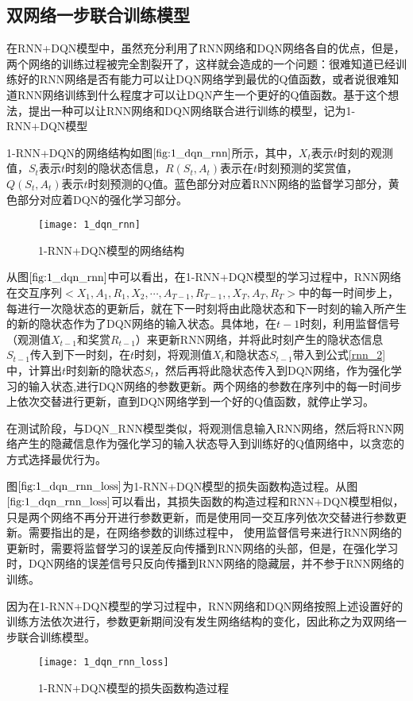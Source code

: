 \subsection{双网络一步联合训练模型}
在RNN+DQN模型中，虽然充分利用了RNN网络和DQN网络各自的优点，但是，两个网络的训练过程被完全割裂开了，这样就会造成的一个问题：很难知道已经训练好的RNN网络是否有能力可以让DQN网络学到最优的Q值函数，或者说很难知道RNN网络训练到什么程度才可以让DQN产生一个更好的Q值函数。基于这个想法，提出一种可以让RNN网络和DQN网络联合进行训练的模型，记为1-RNN+DQN模型

1-RNN+DQN的网络结构如图$\ref{fig:1_dqn_rnn}$所示，其中，$X_{t}$表示$t$时刻的观测值，$S_{t}$表示$t$时刻的隐状态信息，$R(S_{t},A_{t})$表示在$t$时刻预测的奖赏值，$Q(S_{t},A_{t})$表示$t$时刻预测的Q值。蓝色部分对应着RNN网络的监督学习部分，黄色部分对应着DQN的强化学习部分。
\begin{figure}[htbp]
\centering
\texttt{[image: 1\_dqn\_rnn]}
\caption{1-RNN+DQN模型的网络结构}
\label{fig:1_dqn_rnn}
\end{figure}

从图$\ref{fig:1_dqn_rnn}$中可以看出，在1-RNN+DQN模型的学习过程中，RNN网络在交互序列$<X_{1}, A_{1}, R_{1}, X_{2}, \cdots, A_{T-1}, R_{T-1}, ,X_{T}, A_{T}, R_{T}>$中的每一时间步上，每进行一次隐状态的更新后，就在下一时刻将由此隐状态和下一时刻的输入所产生的新的隐状态作为了DQN网络的输入状态。具体地，在$t-1$时刻，利用监督信号（观测值$X_{t-1}$和奖赏$R_{t-1}$）来更新RNN网络，并将此时刻产生的隐状态信息$S_{t-1}$传入到下一时刻，在$t$时刻，将观测值$X_{t}$和隐状态$S_{t-1}$带入到公式\eqref{rnn_2}中，计算出$t$时刻新的隐状态$S_{t}$，然后再将此隐状态传入到DQN网络，作为强化学习的输入状态,进行DQN网络的参数更新。两个网络的参数在序列中的每一时间步上依次交替进行更新，直到DQN网络学到一个好的Q值函数，就停止学习。

在测试阶段，与DQN\_RNN模型类似，将观测信息输入RNN网络，然后将RNN网络产生的隐藏信息作为强化学习的输入状态导入到训练好的Q值网络中，以贪恋的方式选择最优行为。


图$\ref{fig:1_dqn_rnn_loss}$为1-RNN+DQN模型的损失函数构造过程。从图$\ref{fig:1_dqn_rnn_loss}$可以看出，其损失函数的构造过程和RNN+DQN模型相似，只是两个网络不再分开进行参数更新，而是使用同一交互序列依次交替进行参数更新。需要指出的是，在网络参数的训练过程中，
使用监督信号来进行RNN网络的更新时，需要将监督学习的误差反向传播到RNN网络的头部，但是，在强化学习时，DQN网络的误差信号只反向传播到RNN网络的隐藏层，并不参于RNN网络的训练。

因为在1-RNN+DQN模型的学习过程中，RNN网络和DQN网络按照上述设置好的训练方法依次进行，参数更新期间没有发生网络结构的变化，因此称之为双网络一步联合训练模型。
\begin{figure}[htbp]
\centering
\texttt{[image: 1\_dqn\_rnn\_loss]}
\caption{1-RNN+DQN模型的损失函数构造过程}
\label{fig:1_dqn_rnn_loss}
\end{figure}

